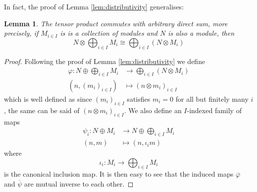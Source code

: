 \documentclass[12pt]{article}
\theoremstyle{plain}
\newtheorem{lemma}[thm]{Lemma}
\theoremstyle{definition}
\newcommand{\lto}{\longrightarrow}
\begin{document}
In fact, the proof of Lemma \ref{lem:distributivity} generalises:
\begin{lemma}\label{lem:tens_sum_commute}
The tensor product commutes with arbitrary direct sum, more precisely, if $M_{i \in I}$ is is a collection of modules and $N$ is also a module, then
\begin{equation}
N \otimes \bigoplus_{i \in I}M_i \cong \bigoplus_{i \in I}(N \otimes M_i)
\end{equation}
\end{lemma}
\begin{proof}
Following the proof of Lemma \ref{lem:distributivity} we define
\begin{align*}
\varphi: N \oplus \bigoplus_{i \in I}M_i &\lto \bigoplus_{i \in I}(N \otimes M_i)\\
(n, (m_i)_{i \in I}) &\longmapsto (n \otimes m_i)_{i \in I}
\end{align*}
which is well defined as since $(m_i)_{i \in I}$ satisfies $m_i = 0$ for all but finitely many $i$, the same can be said of $(n \otimes m_i)_{i \in I}$. We also define an $I$-indexed family of maps
\begin{align*}
\psi_i: N \oplus M_i &\lto N \oplus \bigoplus_{i \in I}M_i\\
(n,m) &\longmapsto (n,\iota_{i}m)
\end{align*}
where
\begin{equation}
\iota_i: M_i \lto \bigoplus_{i \in I}M_i
\end{equation}
is the canonical inclusion map. It is then easy to see that the induced maps $\overline{\varphi}$ and $\overline{\psi}$ are mutual inverse to each other.
\end{proof}
\end{document}
